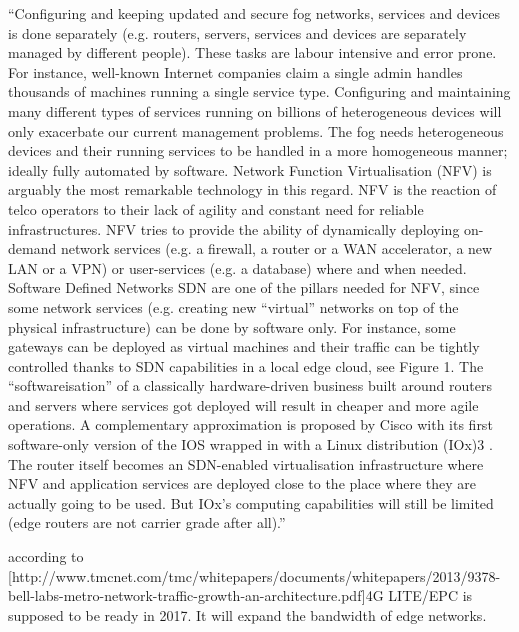 ``Configuring and keeping updated and secure fog networks,
services and devices is done separately (e.g. routers, servers,
services and devices are separately managed by different
people). These tasks are labour intensive and error prone.
For instance, well-known Internet companies claim a single
admin handles thousands of machines running a single service
type. Configuring and maintaining many different types
of services running on billions of heterogeneous devices will
only exacerbate our current management problems. The
fog needs heterogeneous devices and their running services
to be handled in a more homogeneous manner; ideally fully
automated by software.
Network Function Virtualisation (NFV) is arguably the
most remarkable technology in this regard. NFV is the reaction
of telco operators to their lack of agility and constant
need for reliable infrastructures. NFV tries to provide
the ability of dynamically deploying on-demand network services
(e.g. a firewall, a router or a WAN accelerator, a new
LAN or a VPN) or user-services (e.g. a database) where
and when needed. Software Defined Networks SDN are one
of the pillars needed for NFV, since some network services
(e.g. creating new “virtual” networks on top of the physical
infrastructure) can be done by software only. For instance,
some gateways can be deployed as virtual machines and their
traffic can be tightly controlled thanks to SDN capabilities
in a local edge cloud, see Figure 1. The “softwareisation” of
a classically hardware-driven business built around routers
and servers where services got deployed will result in cheaper
and more agile operations.
A complementary approximation is proposed by Cisco
with its first software-only version of the IOS wrapped in
with a Linux distribution (IOx)3
. The router itself becomes
an SDN-enabled virtualisation infrastructure where
NFV and application services are deployed close to the place
where they are actually going to be used. But IOx’s computing
capabilities will still be limited (edge routers are not
carrier grade after all).''

according to [http://www.tmcnet.com/tmc/whitepapers/documents/whitepapers/2013/9378-bell-labs-metro-network-traffic-growth-an-architecture.pdf]4G LITE/EPC is supposed to be ready in 2017. It will expand the bandwidth of edge networks.




